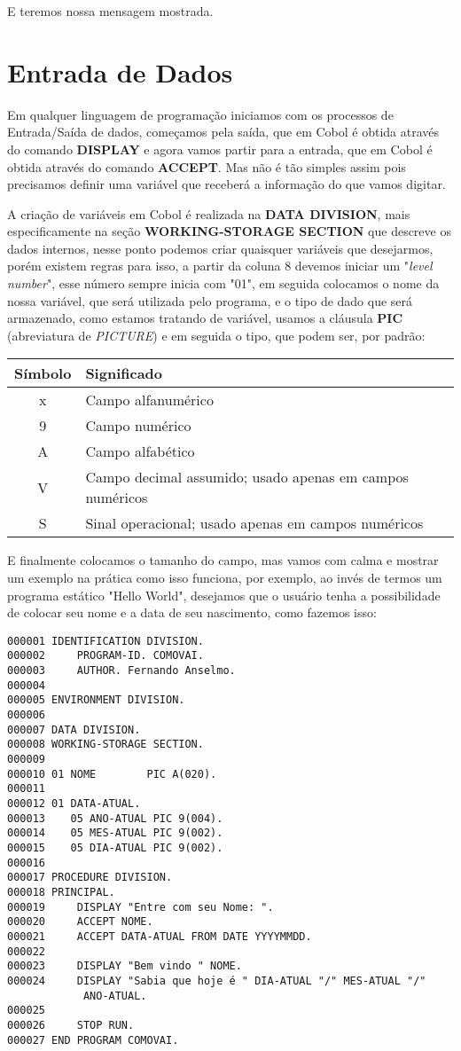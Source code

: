 E teremos nossa mensagem mostrada.

\section{Entrada de Dados}
Em qualquer linguagem de programação iniciamos com os processos de Entrada/Saída de dados, começamos pela saída, que em Cobol é obtida através do comando \textbf{DISPLAY} e agora vamos partir para a entrada, que em Cobol é obtida através do comando \textbf{ACCEPT}. Mas não é tão simples assim pois precisamos definir uma variável que receberá a informação do que vamos digitar.

A criação de variáveis em Cobol é realizada na \textbf{DATA DIVISION}, mais especificamente na seção \textbf{WORKING-STORAGE SECTION} que descreve os dados internos, nesse ponto podemos criar quaisquer variáveis que desejarmos, porém existem regras para isso, a partir da coluna 8 devemos iniciar um "\textit{level number}", esse número sempre inicia com "01", em seguida colocamos o nome da nossa variável, que será utilizada pelo programa, e o tipo de dado que será armazenado, como estamos tratando de variável, usamos a cláusula \textbf{PIC} (abreviatura de \textit{PICTURE}) e em seguida o tipo, que podem ser, por padrão:

\begin{table}[H]
	\centering 
	\begin{tabular}{c | l }
		\textbf{Símbolo} & \textbf{Significado} \\ \hline
		x & Campo alfanumérico \\
		9 & Campo numérico \\
		A & Campo alfabético \\
		V & Campo decimal assumido; usado apenas em campos numéricos \\
		S & Sinal operacional; usado apenas em campos numéricos \\
	\end{tabular}
\end{table}

E finalmente colocamos o tamanho do campo, mas vamos com calma e mostrar um exemplo na prática como isso funciona, por exemplo, ao invés de termos um programa estático "Hello World", desejamos que o usuário tenha a possibilidade de colocar seu nome e a data de seu nascimento, como fazemos isso:
\begin{lstlisting}[]
000001 IDENTIFICATION DIVISION.
000002     PROGRAM-ID. COMOVAI.
000003     AUTHOR. Fernando Anselmo.
000004
000005 ENVIRONMENT DIVISION.
000006       
000007 DATA DIVISION.
000008 WORKING-STORAGE SECTION.
000009
000010 01 NOME        PIC A(020).
000011
000012 01 DATA-ATUAL.
000013    05 ANO-ATUAL PIC 9(004).
000014    05 MES-ATUAL PIC 9(002).
000015    05 DIA-ATUAL PIC 9(002).
000016
000017 PROCEDURE DIVISION.
000018 PRINCIPAL.
000019     DISPLAY "Entre com seu Nome: ".
000020     ACCEPT NOME.
000021     ACCEPT DATA-ATUAL FROM DATE YYYYMMDD.
000022
000023     DISPLAY "Bem vindo " NOME.
000024     DISPLAY "Sabia que hoje é " DIA-ATUAL "/" MES-ATUAL "/" 
            ANO-ATUAL.
000025
000026     STOP RUN.
000027 END PROGRAM COMOVAI.

\end{lstlisting}

